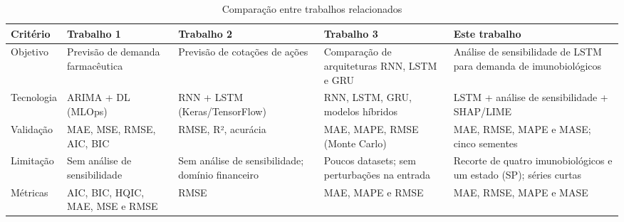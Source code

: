 \documentclass[
    12pt,
    openright,
    oneside,
    a4paper,
    english,
    brazil
]{abntex2}
\begin{document}
\begin{table}[htb]
    \centering
    \caption{Comparação entre trabalhos relacionados}
    \label{tab:trabalhos_relacionados}

    \footnotesize
    \begin{tabularx}{\textwidth}{>{\raggedright\arraybackslash}p{1.9cm}|>{\raggedright\arraybackslash}X|>{\raggedright\arraybackslash}X|>{\raggedright\arraybackslash}X|>{\raggedright\arraybackslash}X}
        \toprule
        \textbf{Critério} & \textbf{Trabalho 1} & \textbf{Trabalho 2} & \textbf{Trabalho 3} & \textbf{Este trabalho} \\
        \midrule
        Objetivo
        & Previsão de demanda farmacêutica
        & Previsão de cotações de ações
        & Comparação de arquiteturas RNN, LSTM e GRU
        & Análise de sensibilidade de LSTM para demanda de imunobiológicos \\

        \midrule

        Tecnologia
        & ARIMA + DL (MLOps)
        & RNN + LSTM (Keras/TensorFlow)
        & RNN, LSTM, GRU, modelos híbridos
        & LSTM + análise de sensibilidade + SHAP/LIME \\

        \midrule

        Validação
        & MAE, MSE, RMSE, AIC, BIC
        & RMSE, R², acurácia
        & MAE, MAPE, RMSE (Monte Carlo)
        & MAE, RMSE, MAPE e MASE; cinco sementes \\

        \midrule

        Limitação
        & Sem análise de sensibilidade
        & Sem análise de sensibilidade; domínio financeiro
        & Poucos datasets; sem perturbações na entrada
        & Recorte de quatro imunobiológicos e um estado (SP); séries curtas \\

        \midrule
        Métricas
        & AIC, BIC, HQIC, MAE, MSE e RMSE
        & RMSE
        & MAE, MAPE e RMSE
        & MAE, RMSE, MAPE e MASE \\

        \bottomrule
    \end{tabularx}

\end{table}

\end{document}
